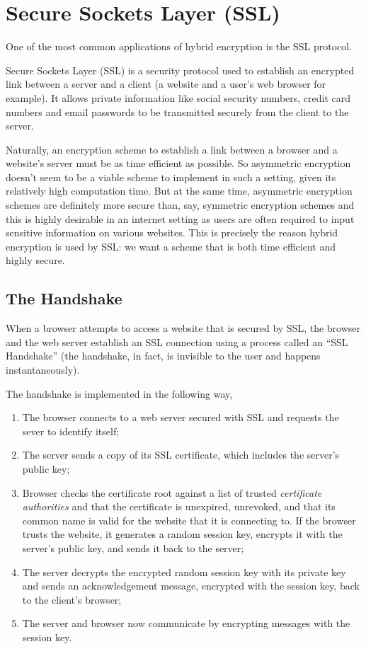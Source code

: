 \section{Secure Sockets Layer (SSL)}

One of the most common applications of hybrid encryption is the SSL protocol.

Secure Sockets Layer (SSL) is a security protocol used to establish an encrypted link between a server and a client (a website and a user's web browser for example). It allows private information like social security numbers, credit card numbers and email passwords to be transmitted securely from the client to the server.

Naturally, an encryption scheme to establish a link between a browser and a website's server must be as time efficient as possible. So asymmetric encryption doesn't seem to be a viable scheme to implement in such a setting, given its relatively high computation time. But at the same time, asymmetric encryption schemes are definitely more secure than, say, symmetric encryption schemes and this is highly desirable in an internet setting as users are often required to input sensitive information on various websites. This is precisely the reason hybrid encryption is used by SSL: we want a scheme that is both time efficient and highly secure.

\subsection{The Handshake}

\cite{digicert}When a browser attempts to access a website that is secured by SSL, the browser and the web server establish an SSL connection using a process called an “SSL Handshake” (the handshake, in fact, is invisible to the user and happens instantaneously).

The handshake is implemented in the following way,
\begin{enumerate}
\item The browser connects to a web server secured with SSL and requests the sever to identify itself;
\item The server sends a copy of its SSL certificate, which includes the server's public key;
\item Browser checks the certificate root against a list of trusted \textit{certificate authorities} and that the certificate is unexpired, unrevoked, and that its common name is valid for the website that it is connecting to. If the browser trusts the website, it generates a random session key, encrypts it with the server's public key, and sends it back to the server;
\item The server decrypts the encrypted random session key with its private key and sends an acknowledgement message, encrypted with the session key, back to the client's browser;
\item The server and browser now communicate by encrypting messages with the session key.
\end{enumerate}  %

\label{sec:ssl}
